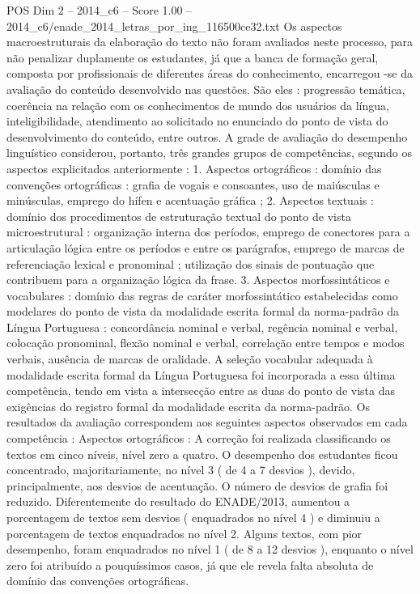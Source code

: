 \begin{textsample}{POS Dim 2 – 2014\_c6 – Score 1.00 – 2014\_c6/enade\_2014\_letras\_por\_ing\_116500ce32.txt}
Os aspectos macroestruturais da elaboração do texto não foram avaliados neste processo, para não penalizar duplamente os estudantes, já que a banca de formação geral, composta por profissionais de diferentes áreas do conhecimento, encarregou -se da avaliação do conteúdo desenvolvido nas questões.
São eles : progressão temática, coerência na relação com os conhecimentos de mundo dos usuários da língua, inteligibilidade, atendimento ao solicitado no enunciado do ponto de vista do desenvolvimento do conteúdo, entre outros.
A grade de avaliação do desempenho linguístico considerou, portanto, três grandes grupos de competências, segundo os aspectos explicitados anteriormente : 1.
Aspectos ortográficos : domínio das convenções ortográficas : grafia de vogais e consoantes, uso de maiúsculas e minúsculas, emprego do hífen e acentuação gráfica ; 2.
Aspectos textuais : domínio dos procedimentos de estruturação textual do ponto de vista microestrutural : organização interna dos períodos, emprego de conectores para a articulação lógica entre os períodos e entre os parágrafos, emprego de marcas de referenciação lexical e pronominal ; utilização dos sinais de pontuação que contribuem para a organização lógica da frase. 3.
Aspectos morfossintáticos e vocabulares : domínio das regras de caráter morfossintático estabelecidas como modelares do ponto de vista da modalidade escrita formal da norma-padrão da Língua Portuguesa : concordância nominal e verbal, regência nominal e verbal, colocação pronominal, flexão nominal e verbal, correlação entre tempos e modos verbais, ausência de marcas de oralidade.
A seleção vocabular adequada à modalidade escrita formal da Língua Portuguesa foi incorporada a essa última competência, tendo em vista a intersecção entre as duas do ponto de vista das exigências do registro formal da modalidade escrita da norma-padrão.
Os resultados da avaliação correspondem aos seguintes aspectos observados em cada competência : Aspectos ortográficos : A correção foi realizada classificando os textos em cinco níveis, nível zero a quatro.
O desempenho dos estudantes ficou concentrado, majoritariamente, no nível 3 ( de 4 a 7 desvios ), devido, principalmente, aos desvios de acentuação.
O número de desvios de grafia foi reduzido.
Diferentemente do resultado do ENADE/2013, aumentou a porcentagem de textos sem desvios ( enquadrados no nível 4 ) e diminuiu a porcentagem de textos enquadrados no nível 2.
Alguns textos, com pior desempenho, foram enquadrados no nível 1 ( de 8 a 12 desvios ), enquanto o nível zero foi atribuído a pouquíssimos casos, já que ele revela falta absoluta de domínio das convenções ortográficas.

\end{textsample}
